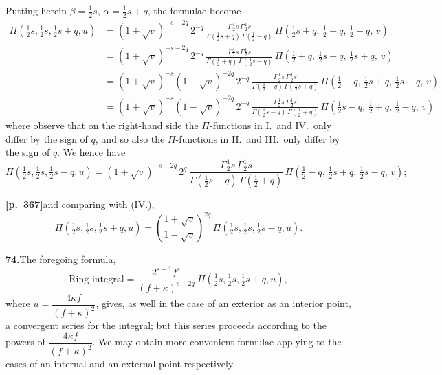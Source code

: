 \documentclass[11pt]{article}
\begin{document}
Putting herein $\beta=\tfrac{1}{2}s$, $\alpha=\tfrac{1}{2}s+q$, the formulae become
\begin{align*}
\Pi(\tfrac{1}{2}s,\tfrac{1}{2}s,\tfrac{1}{2}s+q,u)
&= (1+\sqrt{v})^{-s-2q}\,2^{-q}\,\frac{\Gamma\tfrac{1}{2}s\,\Gamma\tfrac{1}{2}s}{\Gamma(\tfrac{1}{2}s+q)\,\Gamma(\tfrac{1}{2}-q)}\,\Pi(\tfrac{1}{2}s+q,\,\tfrac{1}{2}-q,\,\tfrac{1}{2}+q,\,v) \tag{I.} \\[4pt]
&= (1+\sqrt{v})^{-s-2q}\,2^{-q}\,\frac{\Gamma\tfrac{1}{2}s\,\Gamma\tfrac{1}{2}s}{\Gamma(\tfrac{1}{2}+q)\,\Gamma(\tfrac{1}{2}s-q)}\,\Pi(\tfrac{1}{2}+q,\,\tfrac{1}{2}s-q,\,\tfrac{1}{2}s+q,\,v) \tag{II.} \\[4pt]
&= (1+\sqrt{v})^{-s}(1-\sqrt{v})^{-2q}\,2^{-q}\,\frac{\Gamma\tfrac{1}{2}s\,\Gamma\tfrac{1}{2}s}{\Gamma(\tfrac{1}{2}-q)\,\Gamma(\tfrac{1}{2}s+q)}\,\Pi(\tfrac{1}{2}-q,\,\tfrac{1}{2}s+q,\,\tfrac{1}{2}s-q,\,v) \tag{III.} \\[4pt]
&= (1+\sqrt{v})^{-s}(1-\sqrt{v})^{-2q}\,2^{-q}\,\frac{\Gamma\tfrac{1}{2}s\,\Gamma\tfrac{1}{2}s}{\Gamma(\tfrac{1}{2}s-q)\,\Gamma(\tfrac{1}{2}+q)}\,\Pi(\tfrac{1}{2}s-q,\,\tfrac{1}{2}+q,\,\tfrac{1}{2}-q,\,v) \tag{IV.}
\end{align*}
where observe that on the right-hand side the $\Pi$-functions in I.\ and IV.\ only differ by the sign of $q$, and so also the $\Pi$-functions in II.\ and III.\ only differ by the sign of $q$. We hence have
\[
\Pi(\tfrac{1}{2}s,\tfrac{1}{2}s,\tfrac{1}{2}s-q,u)
= (1+\sqrt{v})^{-s+2q}\,2^{q}\,\frac{\Gamma\tfrac{1}{2}s\,\Gamma\tfrac{1}{2}s}{\Gamma(\tfrac{1}{2}s-q)\,\Gamma(\tfrac{1}{2}+q)}\,\Pi(\tfrac{1}{2}-q,\,\tfrac{1}{2}s+q,\,\tfrac{1}{2}s-q,\,v);
\]

\bigskip

\noindent\textbf{[p.~367]}\quad and comparing with (IV.),
\[
\Pi(\tfrac{1}{2}s,\tfrac{1}{2}s,\tfrac{1}{2}s+q,u)
= \left(\frac{1+\sqrt{v}}{1-\sqrt{v}}\right)^{2q}\,\Pi(\tfrac{1}{2}s,\tfrac{1}{2}s,\tfrac{1}{2}s-q,u).
\]

\bigskip

\noindent\textbf{74.}\quad The foregoing formula,
\[
\text{Ring-integral} = \frac{2^{s-1}f^{s}}{(f+\kappa)^{s+2q}}\,\Pi(\tfrac{1}{2}s,\tfrac{1}{2}s,\tfrac{1}{2}s+q,u),
\]
where $u = \dfrac{4\kappa f}{(f+\kappa)^{2}}$, gives, as well in the case of an exterior as an interior point, a convergent series for the integral; but this series proceeds according to the powers of $\dfrac{4\kappa f}{(f+\kappa)^{2}}$. We may obtain more convenient formulae applying to the cases of an internal and an external point respectively.
\end{document}
